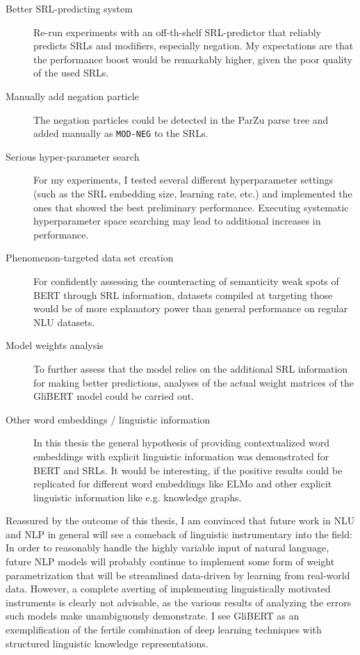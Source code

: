 \begin{description}
  \item[Better SRL-predicting system] Re-run experiments with an off-th-shelf SRL-predictor that reliably
    predicts SRLs and modifiers, especially negation. My expectations are that the performance boost would
    be remarkably higher, given the poor quality of the used SRLs.
  \item[Manually add negation particle] The negation particles could be detected in the ParZu parse
    tree and added manually as \texttt{MOD-NEG} to the SRLs.
  \item[Serious hyper-parameter search] For my experiments, I tested several different hyperparameter
    settings (such as the SRL embedding size, learning rate, etc.) and implemented the ones that
    showed the best preliminary performance. Executing systematic hyperparameter space searching may
    lead to additional increases in performance.
  \item[Phenomenon-targeted data set creation] For confidently assessing the counteracting of semanticity
    weak spots of BERT through SRL information, datasets compiled at targeting those would be of more
    explanatory power than general performance on regular NLU datasets.
  \item[Model weights analysis] To further assess that the model relies on the additional SRL information for
    making better predictions, analyses of the actual weight matrices of the GliBERT model could be carried out.
  \item[Other word embeddings / linguistic information] In this thesis the general hypothesis of providing
    contextualized word embeddings with explicit linguistic information was demonstrated for BERT and SRLs.
    It would be interesting, if the positive results could be replicated for different word embeddings like
    ELMo and other explicit linguistic information like e.g. knowledge graphs.
\end{description}

Reassured by the outcome of this thesis, I am convinced that future work in
NLU and NLP in general will see a comeback of linguistic instrumentary into
the field: In order to reasonably handle the highly variable input of natural
language, future NLP models will probably continue to implement some form of
weight parametrization that will be streamlined data-driven by learning from
real-world data. However, a complete averting of implementing linguistically
motivated instruments is clearly not advisable, as the various results of
analyzing the errors such models make unambiguously demonstrate. I see GliBERT
as an exemplification of the fertile combination of deep learning techniques
with structured linguistic knowledge representations.

